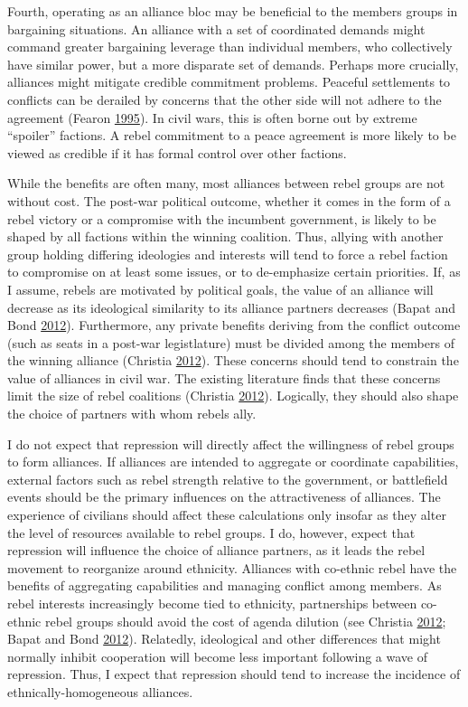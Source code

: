 \documentclass[12pt,]{book}
\theoremstyle{definition}
\theoremstyle{definition}
\theoremstyle{definition}
\theoremstyle{remark}
\begin{document}
Fourth, operating as an alliance bloc may be beneficial to the members
groups in bargaining situations. An alliance with a set of coordinated
demands might command greater bargaining leverage than individual
members, who collectively have similar power, but a more disparate set
of demands. Perhaps more crucially, alliances might mitigate credible
commitment problems. Peaceful settlements to conflicts can be derailed
by concerns that the other side will not adhere to the agreement (Fearon
\protect\hyperlink{ref-fearon95}{1995}). In civil wars, this is often
borne out by extreme ``spoiler'' factions. A rebel commitment to a peace
agreement is more likely to be viewed as credible if it has formal
control over other factions.

While the benefits are often many, most alliances between rebel groups
are not without cost. The post-war political outcome, whether it comes
in the form of a rebel victory or a compromise with the incumbent
government, is likely to be shaped by all factions within the winning
coalition. Thus, allying with another group holding differing ideologies
and interests will tend to force a rebel faction to compromise on at
least some issues, or to de-emphasize certain priorities. If, as I
assume, rebels are motivated by political goals, the value of an
alliance will decrease as its ideological similarity to its alliance
partners decreases (Bapat and Bond
\protect\hyperlink{ref-Bapat2012}{2012}). Furthermore, any private
benefits deriving from the conflict outcome (such as seats in a post-war
legistlature) must be divided among the members of the winning alliance
(Christia \protect\hyperlink{ref-Christia2012}{2012}). These concerns
should tend to constrain the value of alliances in civil war. The
existing literature finds that these concerns limit the size of rebel
coalitions (Christia \protect\hyperlink{ref-Christia2012}{2012}).
Logically, they should also shape the choice of partners with whom
rebels ally.

I do not expect that repression will directly affect the willingness of
rebel groups to form alliances. If alliances are intended to aggregate
or coordinate capabilities, external factors such as rebel strength
relative to the government, or battlefield events should be the primary
influences on the attractiveness of alliances. The experience of
civilians should affect these calculations only insofar as they alter
the level of resources available to rebel groups. I do, however, expect
that repression will influence the choice of alliance partners, as it
leads the rebel movement to reorganize around ethnicity. Alliances with
co-ethnic rebel have the benefits of aggregating capabilities and
managing conflict among members. As rebel interests increasingly become
tied to ethnicity, partnerships between co-ethnic rebel groups should
avoid the cost of agenda dilution (see Christia
\protect\hyperlink{ref-Christia2012}{2012}; Bapat and Bond
\protect\hyperlink{ref-Bapat2012}{2012}). Relatedly, ideological and
other differences that might normally inhibit cooperation will become
less important following a wave of repression. Thus, I expect that
repression should tend to increase the incidence of
ethnically-homogeneous alliances.
\end{document}
